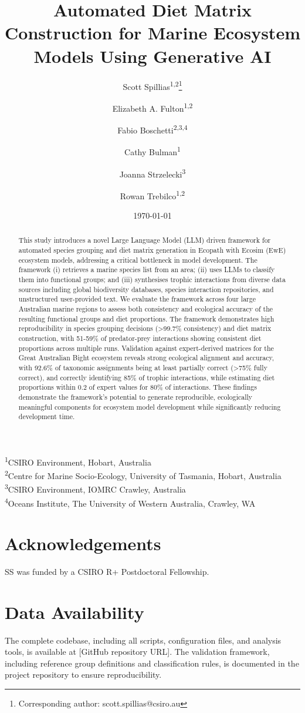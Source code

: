 \documentclass[12pt,a4paper]{article}
\title{Automated Diet Matrix Construction for Marine Ecosystem Models Using Generative AI}
\author{Scott Spillias\textsuperscript{1,2}\thanks{Corresponding author: scott.spillias@csiro.au} \and
Elizabeth A. Fulton\textsuperscript{1,2} \and
Fabio Boschetti\textsuperscript{2,3,4} \and
Cathy Bulman\textsuperscript{1} \and
Joanna Strzelecki\textsuperscript{3} \and
Rowan Trebilco\textsuperscript{1,2}}
\date{\today}  %
\newcommand{\affiliations}{
\noindent\textsuperscript{1}CSIRO Environment, Hobart, Australia\\
\textsuperscript{2}Centre for Marine Socio-Ecology, University of Tasmania, Hobart, Australia\\
\textsuperscript{3}CSIRO Environment, IOMRC Crawley, Australia\\
\textsuperscript{4}Oceans Institute, The University of Western Australia, Crawley, WA\\
}
\begin{document}
\maketitle
\affiliations

\begin{abstract}
This study introduces a novel Large Language Model (LLM) driven framework for automated species grouping and diet matrix generation in Ecopath with Ecosim (EwE) ecosystem models, addressing a critical bottleneck in model development. The framework (i) retrieves a marine species list from an area; (ii) uses LLMs to classify them into functional groups; and (iii) synthesises trophic interactions from diverse data sources including global biodiversity databases, species interaction repositories, and unstructured user-provided text. We evaluate the framework across four large Australian marine regions to assess both consistency and ecological accuracy of the resulting functional groups and diet proportions. The framework demonstrates high reproducibility in species grouping decisions (>99.7\% consistency) and diet matrix construction, with 51-59\% of predator-prey interactions showing consistent diet proportions across multiple runs. Validation against expert-derived matrices for the Great Australian Bight ecosystem reveals strong ecological alignment and accuracy, with 92.6\% of taxonomic assignments being at least partially correct (>75\% fully correct), and correctly identifying 85\% of trophic interactions, while estimating diet proportions within 0.2 of expert values for 80\% of interactions. These findings demonstrate the framework's potential to generate reproducible, ecologically meaningful components for ecosystem model development while significantly reducing development time.
\end{abstract}






\section*{Acknowledgements}
SS was funded by a CSIRO R+ Postdoctoral Fellowship.

\section*{Data Availability}
The complete codebase, including all scripts, configuration files, and analysis tools, is available at [GitHub repository URL]. The validation framework, including reference group definitions and classification rules, is documented in the project repository to ensure reproducibility.
\end{document}
